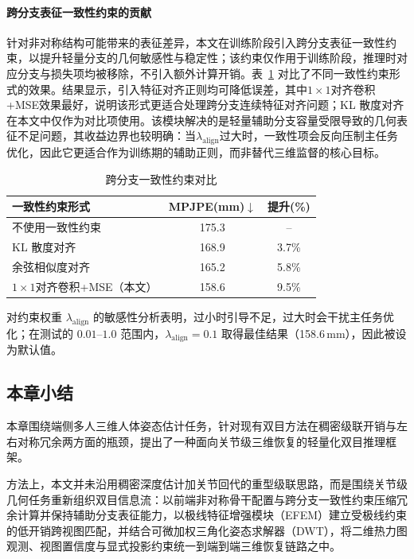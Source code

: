 \paragraph{跨分支表征一致性约束的贡献}
针对非对称结构可能带来的表征差异，本文在训练阶段引入跨分支表征一致性约束，以提升轻量分支的几何敏感性与稳定性；该约束仅作用于训练阶段，推理时对应分支与损失项均被移除，不引入额外计算开销。表~\ref{tab:ablation_align} 对比了不同一致性约束形式的效果。结果显示，引入特征对齐正则均可降低误差，其中$1\times1$对齐卷积+MSE效果最好，说明该形式更适合处理跨分支连续特征对齐问题；KL 散度对齐在本文中仅作为对比项使用。该模块解决的是轻量辅助分支容量受限导致的几何表征不足问题，其收益边界也较明确：当$\lambda_{\text{align}}$过大时，一致性项会反向压制主任务优化，因此它更适合作为训练期的辅助正则，而非替代三维监督的核心目标。
\begin{table}[htbp]
  \centering
  \small
\caption{跨分支一致性约束对比}
  \label{tab:ablation_align}
  \begin{tabular}{lcc}
    \toprule
    一致性约束形式 & MPJPE(mm)$\downarrow$ & 提升(\%) \\
    \midrule
    不使用一致性约束 & 175.3 & -- \\
    KL 散度对齐 & 168.9 & 3.7\% \\
    余弦相似度对齐 & 165.2 & 5.8\% \\
    $1\times1$对齐卷积+MSE（本文） & 158.6 & 9.5\% \\
    \bottomrule
  \end{tabular}
\end{table}

对约束权重 $\lambda_{\text{align}}$ 的敏感性分析表明，过小时引导不足，过大时会干扰主任务优化；在测试的 $0.01$--$1.0$ 范围内，$\lambda_{\text{align}}=0.1$ 取得最佳结果（158.6\,mm），因此被设为默认值。

\subsection{本章小结}

本章围绕端侧多人三维人体姿态估计任务，针对现有双目方法在稠密级联开销与左右对称冗余两方面的瓶颈，提出了一种面向关节级三维恢复的轻量化双目推理框架。

方法上，本文并未沿用稠密深度估计加关节回代的重型级联思路，而是围绕关节级几何任务重新组织双目信息流：以前端非对称骨干配置与跨分支一致性约束压缩冗余计算并保持辅助分支表征能力，以极线特征增强模块（EFEM）建立受极线约束的低开销跨视图匹配，并结合可微加权三角化姿态求解器（DWT），将二维热力图观测、视图置信度与显式投影约束统一到端到端三维恢复链路之中。

